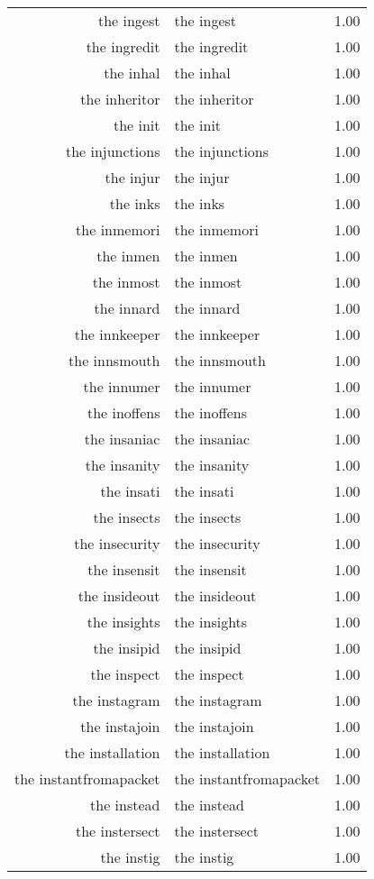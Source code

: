\begin{table}[ht]
\begin{tabular}{rlr}
  the ingest & the ingest & 1.00 \\ 
  the ingredit & the ingredit & 1.00 \\ 
  the inhal & the inhal & 1.00 \\ 
  the inheritor & the inheritor & 1.00 \\ 
  the init & the init & 1.00 \\ 
  the injunctions & the injunctions & 1.00 \\ 
  the injur & the injur & 1.00 \\ 
  the inks & the inks & 1.00 \\ 
  the inmemori & the inmemori & 1.00 \\ 
  the inmen & the inmen & 1.00 \\ 
  the inmost & the inmost & 1.00 \\ 
  the innard & the innard & 1.00 \\ 
  the innkeeper & the innkeeper & 1.00 \\ 
  the innsmouth & the innsmouth & 1.00 \\ 
  the innumer & the innumer & 1.00 \\ 
  the inoffens & the inoffens & 1.00 \\ 
  the insaniac & the insaniac & 1.00 \\ 
  the insanity & the insanity & 1.00 \\ 
  the insati & the insati & 1.00 \\ 
  the insects & the insects & 1.00 \\ 
  the insecurity & the insecurity & 1.00 \\ 
  the insensit & the insensit & 1.00 \\ 
  the insideout & the insideout & 1.00 \\ 
  the insights & the insights & 1.00 \\ 
  the insipid & the insipid & 1.00 \\ 
  the inspect & the inspect & 1.00 \\ 
  the instagram & the instagram & 1.00 \\ 
  the instajoin & the instajoin & 1.00 \\ 
  the installation & the installation & 1.00 \\ 
  the instantfromapacket & the instantfromapacket & 1.00 \\ 
  the instead & the instead & 1.00 \\ 
  the instersect & the instersect & 1.00 \\ 
  the instig & the instig & 1.00 \\ 

\end{tabular}
\end{table}
